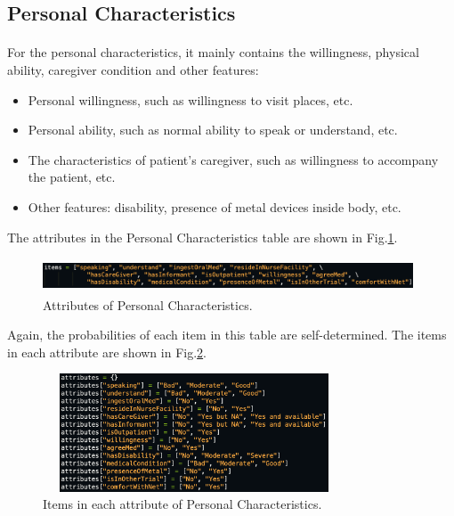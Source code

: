 \documentclass{article}
\begin{document}
\subsection{Personal Characteristics}
\paragraph{}
For the personal characteristics, it mainly contains the willingness, physical ability, caregiver condition and other features:

\begin{itemize}
  \item Personal willingness, such as willingness to visit places, etc.
  \item Personal ability, such as normal ability to speak or understand, etc.
  \item The characteristics of patient's caregiver, such as willingness to accompany the patient, etc.
  \item Other features: disability, presence of metal devices inside body, etc.
\end{itemize}
\vspace{2mm}
\noindent The attributes in the Personal Characteristics table are shown in Fig.\ref{f:personal_attr}.

\begin{figure}[!hbt]
\centering
\includegraphics[width=11cm, height=1cm]{figs/personal_attr.png}
\caption{Attributes of Personal Characteristics.}
\label{f:personal_attr}
\end{figure}

\noindent Again, the probabilities of each item in this table are self-determined. The items in each attribute are shown in Fig.\ref{f:personal}.

\begin{figure}[!hbt]
\centering
\includegraphics[width=9cm, height=3.5cm]{figs/personal.png}
\caption{Items in each attribute of Personal Characteristics.}
\label{f:personal}
\end{figure}
\end{document}
